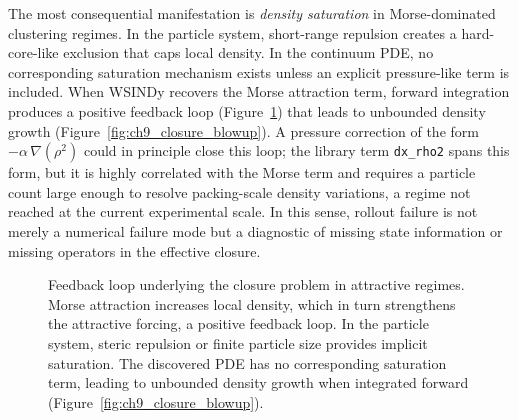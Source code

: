 The most consequential manifestation is \emph{density saturation} in
Morse-dominated clustering regimes.  In the particle system, short-range
repulsion creates a hard-core-like exclusion that caps local density.  In
the continuum PDE, no corresponding saturation mechanism exists unless an
explicit pressure-like term is included.  When WSINDy recovers
the Morse attraction term, forward integration produces a positive feedback
loop (Figure~\ref{fig:closure_feedback}) that leads to unbounded density
growth (Figure~\ref{fig:ch9_closure_blowup}).  A pressure correction of the form
$-\alpha\,\nabla(\rho^2)$ could in principle close this loop; the library
term \texttt{dx\_rho2} spans this form, but it is highly correlated with
the Morse term and requires a particle count large enough to resolve
packing-scale density variations, a regime not reached at the current
experimental scale.  In this sense, rollout failure is not merely a
numerical failure mode but a diagnostic of missing state information or
missing operators in the effective closure.

\begin{figure}[htbp]
\centering
{}
\caption{Feedback loop underlying the closure problem in attractive regimes.
Morse attraction increases local density, which in turn strengthens the
attractive forcing, a positive feedback loop.  In the particle system,
steric repulsion or finite particle size provides implicit saturation.  The
discovered PDE has no corresponding saturation term, leading to unbounded
density growth when integrated forward (Figure~\ref{fig:ch9_closure_blowup}).}
\label{fig:closure_feedback}
\end{figure}

